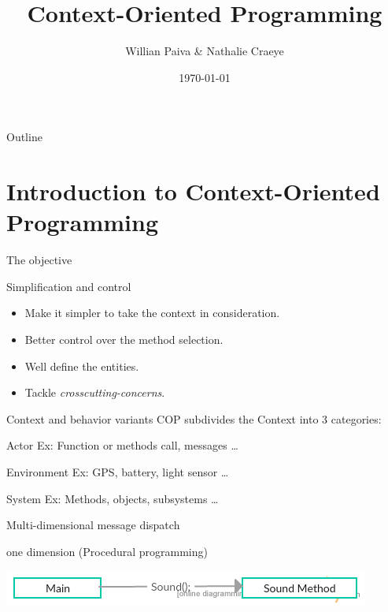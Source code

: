 \documentclass[presentation]{beamer}
\author{Willian Paiva \& Nathalie Craeye}
\date{\today}
\title{Context-Oriented Programming}
\begin{document}
\maketitle
\begin{frame}{Outline}
\tableofcontents
\end{frame}


\section{Introduction to Context-Oriented Programming}
\label{sec:org203da34}

\begin{frame}[label={sec:org06c2a92}]{The objective}
\begin{block}{Simplification and control}
\begin{itemize}
\item Make it simpler to take the context in consideration.
\item Better control over the method selection.
\item Well define the entities.
\item Tackle \emph{crosscutting-concerns}.
\end{itemize}
\end{block}
\end{frame}



\begin{frame}[label={sec:org1fee1dc}]{Context and behavior variants}
COP subdivides the Context into 3 categories:
\begin{block}{Actor}
Ex: Function or methods call, messages \ldots{}
\end{block}
\begin{block}{Environment}
Ex: GPS, battery, light sensor \ldots{} 
\end{block}
\begin{block}{System}
Ex: Methods, objects, subsystems \ldots{}
\end{block}
\end{frame}


\begin{frame}[label={sec:orgd6e65b4}]{Multi-dimensional message dispatch}
\begin{block}{one dimension (Procedural programming)}
\begin{center}
\includegraphics[width=.9\linewidth]{./one.jpg}
\end{center}
\end{block}
\end{frame}
\end{document}
